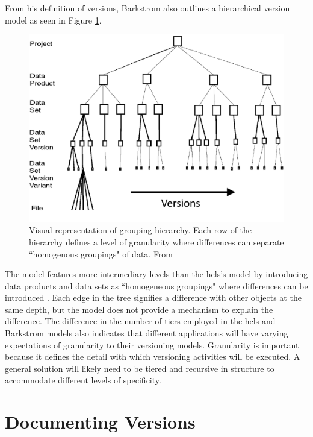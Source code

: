 From his definition of versions, Barkstrom also outlines a hierarchical version model as seen in Figure \ref{hierarchy}.
\begin{figure}
	\centering
	\includegraphics[scale=0.50]{figures/hierarchy.png}
	\caption[Visual representation of grouping hierarchy.]{Visual representation of grouping hierarchy.  Each row of the hierarchy defines a level of granularity where differences can separate ``homogenous groupings" of data.  From \cite{Barkstrom2003}}
	\label{hierarchy}
\end{figure}
The model features more intermediary levels than the \gls{hcls}'s model by introducing data products and data sets as ``homogeneous groupings" where differences can be introduced \cite{barkstrom2014earth}.
Each edge in the tree signifies a difference with other objects at the same depth, but the model does not provide a mechanism to explain the difference.
The difference in the number of tiers employed in the \gls{hcls} and Barkstrom models also indicates that different applications will have varying expectations of granularity to their versioning models.
Granularity is important because it defines the detail with which versioning activities will be executed.
A general solution will likely need to be tiered and recursive in structure to accommodate different levels of specificity.

\section{Documenting Versions} \label{sec:changelog}

